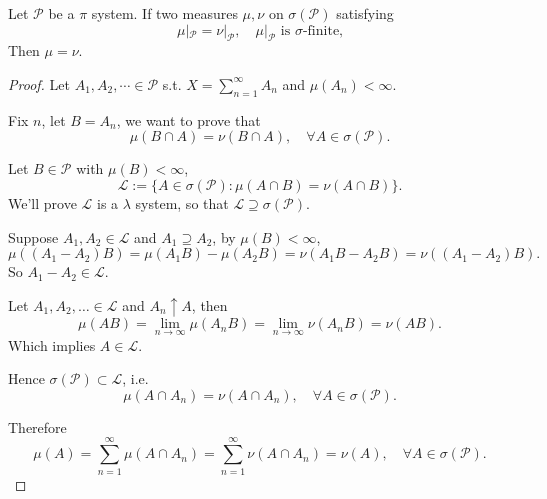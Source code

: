 \begin{proposition}
	Let $ \mathscr{P}$ be a $\pi$ system. If two measures $\mu,\nu$
	on $\sigma(\mathscr{P})$ satisfying
	\[
	\mu|_{\mathscr{P}} = \nu|_{\mathscr{P}}, \quad \mu|_{\mathscr{P}}
	\text{ is $\sigma$-finite,}
	\]
	Then  $\mu = \nu$.
\end{proposition}
\begin{proof}[Proof]
    Let $A_1,A_2,\cdots\in \mathscr{P}$ s.t. $X = \sum_{n=1}^\infty A_n$ and
	$\mu(A_n)<\infty$.

	Fix $n$, let $B = A_n$, we want to prove that
	\[
		\mu(B\cap A)=\nu(B\cap A),\quad \forall A\in \sigma(\mathscr{P}).
	\]

	Let $B\in \mathscr{P}$ with $\mu(B)<\infty$,
	\[
	\mathscr{L} := \{A\in \sigma(\mathscr{P}): \mu(A\cap B) = \nu(A\cap B)\}.
	\]
	We'll prove $\mathscr{L}$ is a $\lambda$ system,
	so that $\mathscr{L}\supseteq \sigma(\mathscr{P})$.

	Suppose $A_1,A_2\in \mathscr{L}$ and $A_1\supseteq A_2$, by $\mu(B)<\infty$,
	\[
	\mu((A_1-A_2)B) = \mu(A_1B) - \mu(A_2B)
	= \nu(A_1B-A_2B) = \nu((A_1-A_2)B).
	\]
	So $A_1-A_2\in \mathscr{L}$.

	Let $A_1,A_2,\dots\in \mathscr{L}$ and $A_n\uparrow A$, then
	\[
	\mu(AB) = \lim_{n\to \infty}\mu(A_nB) = \lim_{n\to \infty}\nu(A_n B) = \nu(AB).
	\]
	Which implies $A\in \mathscr{L}$.

	Hence $\sigma(\mathscr{P}) \subset \mathscr{L}$, i.e.
	\[
	\mu(A\cap A_n) = \nu(A\cap A_n), \quad\forall A\in \sigma(\mathscr{P}).
	\]

	Therefore
	\[
	\mu(A) = \sum_{n=1}^{\infty}\mu(A\cap A_n) = \sum_{n=1}^{\infty} \nu(A\cap A_n)
	= \nu(A), \quad \forall A\in \sigma(\mathscr{P}).
	\]
\end{proof}
